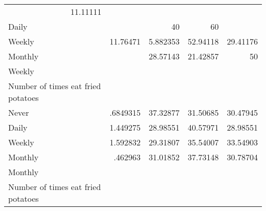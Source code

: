 \documentclass{article}
\begin{document}
\begin{tabular}{lllll}
  \multicolumn{1}{r}{11.11111} \\
\multicolumn{1}{l}{\hspace{5em}Daily} &
  \multicolumn{1}{|r}{} &
  \multicolumn{1}{r}{40} &
  \multicolumn{1}{r}{60} &
  \multicolumn{1}{r}{} \\
\multicolumn{1}{l}{\hspace{5em}Weekly} &
  \multicolumn{1}{|r}{11.76471} &
  \multicolumn{1}{r}{5.882353} &
  \multicolumn{1}{r}{52.94118} &
  \multicolumn{1}{r}{29.41176} \\
\multicolumn{1}{l}{\hspace{5em}Monthly} &
  \multicolumn{1}{|r}{} &
  \multicolumn{1}{r}{28.57143} &
  \multicolumn{1}{r}{21.42857} &
  \multicolumn{1}{r}{50} \\
\multicolumn{1}{l}{\hspace{3em}Weekly} &
  \multicolumn{1}{|r}{} &
  \multicolumn{1}{r}{} &
  \multicolumn{1}{r}{} &
  \multicolumn{1}{r}{} \\
\multicolumn{1}{l}{\hspace{4em}Number of times eat fried potatoes} &
  \multicolumn{1}{|r}{} &
  \multicolumn{1}{r}{} &
  \multicolumn{1}{r}{} &
  \multicolumn{1}{r}{} \\
\multicolumn{1}{l}{\hspace{5em}Never} &
  \multicolumn{1}{|r}{.6849315} &
  \multicolumn{1}{r}{37.32877} &
  \multicolumn{1}{r}{31.50685} &
  \multicolumn{1}{r}{30.47945} \\
\multicolumn{1}{l}{\hspace{5em}Daily} &
  \multicolumn{1}{|r}{1.449275} &
  \multicolumn{1}{r}{28.98551} &
  \multicolumn{1}{r}{40.57971} &
  \multicolumn{1}{r}{28.98551} \\
\multicolumn{1}{l}{\hspace{5em}Weekly} &
  \multicolumn{1}{|r}{1.592832} &
  \multicolumn{1}{r}{29.31807} &
  \multicolumn{1}{r}{35.54007} &
  \multicolumn{1}{r}{33.54903} \\
\multicolumn{1}{l}{\hspace{5em}Monthly} &
  \multicolumn{1}{|r}{.462963} &
  \multicolumn{1}{r}{31.01852} &
  \multicolumn{1}{r}{37.73148} &
  \multicolumn{1}{r}{30.78704} \\
\multicolumn{1}{l}{\hspace{3em}Monthly} &
  \multicolumn{1}{|r}{} &
  \multicolumn{1}{r}{} &
  \multicolumn{1}{r}{} &
  \multicolumn{1}{r}{} \\
\multicolumn{1}{l}{\hspace{4em}Number of times eat fried potatoes} &

\end{tabular}
\end{document}
